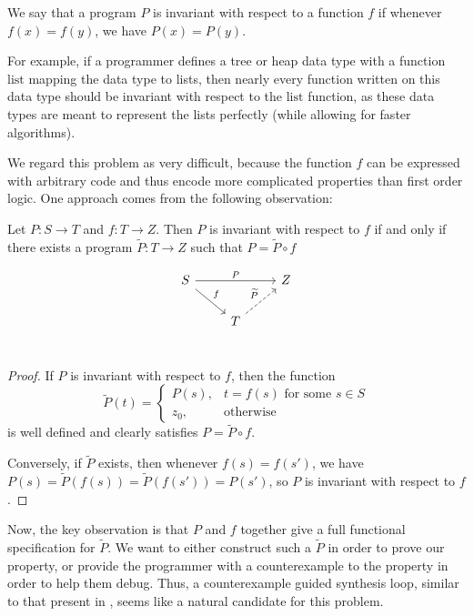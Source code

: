 \documentclass{llncs}
\begin{document}
\begin{definition} We say that a program $P$ is invariant with respect to a
  function $f$ if whenever $f(x)=f(y)$, we have $P(x)=P(y)$.
\end{definition}

For example, if a programmer defines a tree or heap data type with a function
$\mathrm{list}$ mapping the data type to lists,
then nearly every function written on this data type should be invariant with
respect to the $\mathrm{list}$ function,
as these data types are meant to represent the lists perfectly (while allowing
for faster algorithms).

We regard this problem as very difficult, because the function $f$ can be
expressed with arbitrary code and thus encode more complicated properties than
first order logic. One approach comes from the following observation:

\begin{lemma} Let $P : S \to T$ and $f : T \to Z$.
  Then $P$ is invariant with respect to $f$ if and only if
  there exists a program $\widetilde{P} : T\to Z$
  such that $P = \widetilde{P} \circ f$
\end{lemma}
  \[
    \begin{tikzcd}
      S \arrow{rr}{P} \arrow{rd}{f} &   & Z \\
      & T \arrow[dashed]{ru}{\widetilde{P}} &   \\
    \end{tikzcd}
  \]
\begin{proof}
  If $P$ is invariant with respect to $f$, then the function
  \[ \widetilde{P}(t) = \begin{cases}
       P(s), & t = f(s) \text{ for some $s\in S$} \\
       z_0, & \text{otherwise}
     \end{cases}
  \]
  is well defined and clearly satisfies $P = \widetilde{P} \circ f$.

  Conversely, if $\widetilde{P}$ exists, then whenever $f(s)=f(s')$,
  we have $P(s) = \widetilde{P}(f(s)) = \widetilde{P}(f(s')) = P(s')$,
  so $P$ is invariant with respect to $f$.
\end{proof}

Now, the key observation is that $P$ and $f$ together give a full functional
specification for $\widetilde{P}$.
We want to either construct such a $\widetilde{P}$ in order to prove our
property, or provide the programmer with a counterexample to the property in
order to help them debug.
Thus, a counterexample guided synthesis loop,
similar to that present in \cite{solar06},
seems like a natural candidate for this problem.
\end{document}
